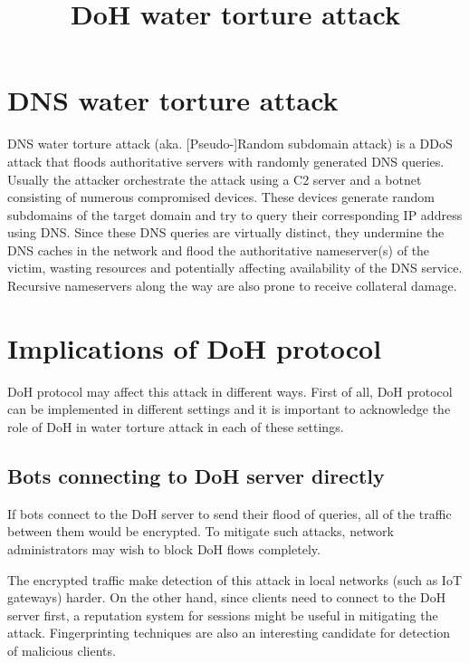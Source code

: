 \documentclass[11pt]{article}
\begin{document}
    \title{DoH water torture attack}
    \date{}
    \maketitle

    \section{DNS water torture attack}
    DNS water torture attack (aka. [Pseudo-]Random subdomain attack) is a DDoS attack that floods authoritative servers with randomly generated DNS queries.
    Usually the attacker orchestrate the attack using a C2 server and a botnet consisting of numerous compromised devices.
    These devices generate random subdomains of the target domain and try to query their corresponding IP address using DNS. Since these DNS queries are virtually distinct, they undermine the DNS caches in the network and flood the authoritative nameserver(s) of the victim, wasting resources and potentially affecting availability of the DNS service.
    Recursive nameservers along the way are also prone to receive collateral damage.

    \section{Implications of DoH protocol}

    DoH protocol may affect this attack in different ways.
    First of all, DoH protocol can be implemented in different settings and it is important to acknowledge the role of DoH in water torture attack in each of these settings.

    \subsection{Bots connecting to DoH server directly}

    If bots connect to the DoH server to send their flood of queries, all of the traffic between them would be encrypted.
    To mitigate such attacks, network administrators may wish to block DoH flows completely.

    The encrypted traffic make detection of this attack in local networks (such as IoT gateways) harder.
    On the other hand, since clients need to connect to the DoH server first, a reputation system for sessions might be useful in mitigating the attack.
    Fingerprinting techniques are also an interesting candidate for detection of malicious clients.
\end{document}
